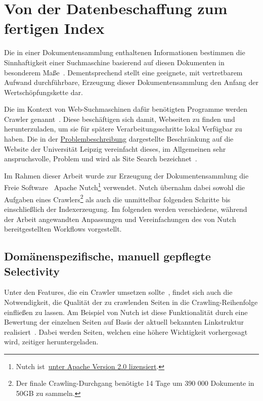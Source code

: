 \section{Von der Datenbeschaffung zum fertigen Index}
\label{chap:data_aqcuisition}

Die in einer Dokumentensammlung enthaltenen Informationen bestimmen die Sinnhaftigkeit
einer Suchmaschine basierend auf diesen Dokumenten in besonderem Maße~\cite{croft.chap3}.
Dementsprechend stellt eine geeignete, mit vertretbarem Aufwand durchführbare,
Erzeugung dieser Dokumentensammlung den Anfang der Wertschöpfungskette dar.

Die im Kontext von Web-Suchmaschinen dafür benötigten Programme werden Crawler genannt~\cite{croft.chap3}.
Diese beschäftigen sich damit, Webseiten zu finden und herunterzuladen, um sie für spätere Verarbeitungsschritte lokal Verfügbar zu haben.
Die in der \hyperref[sec:intro]{Problembeschreibung} dargestellte Beschränkung auf die Website der Universität Leipzig
vereinfacht dieses, im Allgemeinen sehr anspruchsvolle, Problem und wird als Site Search bezeichnet~\cite{croft.chap2}.

Im Rahmen dieser Arbeit wurde zur Erzeugung der Dokumentensammlung die Freie Software~\cite{wiki.free_license}
Apache Nutch\footnote{Nutch ist~\href{https://github.com/apache/nutch/blob/master/LICENSE.txt}{unter Apache Version 2.0 lizensiert}.}
verwendet.
Nutch übernahm dabei sowohl die Aufgaben eines Crawlers\footnote{Der finale Crawling-Durchgang benötigte 14 Tage um 390 000 Dokumente in 50GB zu sammeln.}
als auch die unmittelbar folgenden Schritte bis einschließlich der Indexerzeugung.
Im folgenden werden verschiedene, während der Arbeit angewandten Anpassungen und Vereinfachungen des von Nutch bereitgestellten
Workflows vorgestellt.
 
\subsection{Domänenspezifische, manuell gepflegte Selectivity}
Unter den Features, die ein Crawler umsetzen sollte~\cite{manning.chap20},
findet sich auch die Notwendigkeit, die Qualität der zu crawlenden Seiten
in die Crawling-Reihenfolge einfließen zu lassen.
Am Beispiel von Nutch ist diese Funktionalität durch eine Bewertung der einzelnen Seiten
auf Basis der aktuell bekannten Linkstruktur realisiert~\cite{nutch.invert_links}.
Dabei werden Seiten, welchen eine höhere Wichtigkeit vorhergesagt wird, zeitiger heruntergeladen.

